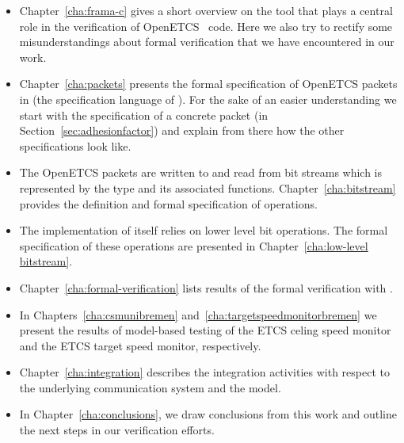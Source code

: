 \begin{itemize}
\item
Chapter~\ref{cha:frama-c} gives a short overview on the \framacwp tool
that plays a central role in the verification of OpenETCS \isoc~code.
Here we also try to rectify some misunderstandings about formal verification
that we have encountered in our work.

\item
Chapter~\ref{cha:packets} presents the formal specification of OpenETCS
packets in \acsl (the specification language of \framac).
For the sake of an easier understanding we start with the specification of
a concrete packet (\adhesion in Section~\ref{sec:adhesionfactor})
and explain from there how the other specifications look like.

\item
The OpenETCS packets are written to and read from bit streams which is represented
by the type  and its associated functions.
Chapter~\ref{cha:bitstream} provides the definition and formal specification
of  operations.

\item
The implementation of  itself relies on lower level bit operations.
The formal specification of these operations are presented in Chapter~\ref{cha:low-level bitstream}.

\item 
Chapter~\ref{cha:formal-verification} lists results of the formal verification with \framacwp.

\item
In Chapters~\ref{cha:csmunibremen} and~\ref{cha:targetspeedmonitorbremen}
we present the results of model-based testing of the ETCS celing speed monitor and
the ETCS target speed monitor, respectively.

\item 
Chapter~\ref{cha:integration} describes the integration activities with respect to the underlying
communication system and the \scade model.

\item
In Chapter~\ref{cha:conclusions}, we draw conclusions from this work
and outline the next steps in our verification efforts.
\end{itemize}

